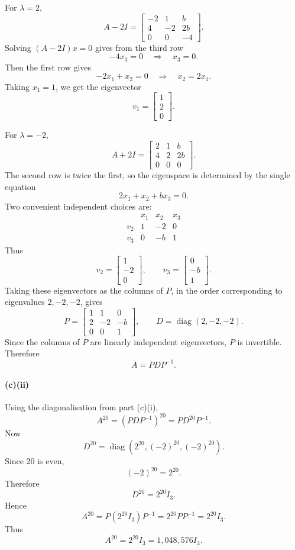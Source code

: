 \documentclass[12pt]{article}
\newcommand{\diag}{\operatorname{diag}}
\begin{document}
For $\lambda=2$,
\[
A-2I=
\begin{bmatrix}
-2&1&b\\
4&-2&2b\\
0&0&-4
\end{bmatrix}.
\]
Solving $(A-2I)x=0$ gives from the third row
\[
-4x_3=0\quad\Longrightarrow\quad x_3=0.
\]
Then the first row gives
\[
-2x_1+x_2=0
\quad\Longrightarrow\quad x_2=2x_1.
\]
Taking $x_1=1$, we get the eigenvector
\[
v_1=\begin{bmatrix}1\\2\\0\end{bmatrix}.
\]

For $\lambda=-2$,
\[
A+2I=
\begin{bmatrix}
2&1&b\\
4&2&2b\\
0&0&0
\end{bmatrix}.
\]
The second row is twice the first, so the eigenspace is determined by the single equation
\[
2x_1+x_2+bx_3=0.
\]
Two convenient independent choices are:
\[
\begin{array}{c|ccc}
 &x_1&x_2&x_3\\ \hline
v_2&1&-2&0\\
v_3&0&-b&1
\end{array}
\]
Thus
\[
v_2=\begin{bmatrix}1\\-2\\0\end{bmatrix},
\qquad
v_3=\begin{bmatrix}0\\-b\\1\end{bmatrix}.
\]
Taking these eigenvectors as the columns of $P$, in the order corresponding to eigenvalues $2,-2,-2$, gives
\[
\boxed{
P=
\begin{bmatrix}
1&1&0\\
2&-2&-b\\
0&0&1
\end{bmatrix},
\qquad
D=\diag(2,-2,-2).}
\]
Since the columns of $P$ are linearly independent eigenvectors, $P$ is invertible. Therefore
\[
\boxed{A=PDP^{-1}.}
\]

\paragraph{(c)(ii)}
Using the diagonalisation from part (c)(i),
\[
A^{20}=(PDP^{-1})^{20}=PD^{20}P^{-1}.
\]
Now
\[
D^{20}
=\diag(2^{20},(-2)^{20},(-2)^{20}).
\]
Since $20$ is even,
\[
(-2)^{20}=2^{20}.
\]
Therefore
\[
D^{20}=2^{20}I_3.
\]
Hence
\[
A^{20}=P(2^{20}I_3)P^{-1}=2^{20}PP^{-1}=2^{20}I_3.
\]
Thus
\[
\boxed{A^{20}=2^{20}I_3=1{,}048{,}576I_3.}
\]
\end{document}
